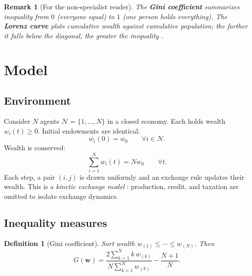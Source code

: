 \documentclass[12pt,a4paper]{article}
\newtheorem{definition}{Definition}
\newtheorem{remark}{Remark}
\begin{document}
\begin{remark}[For the non-specialist reader]
  The \textbf{Gini coefficient} summarizes inequality from $0$ (everyone equal) to $1$ (one person holds everything).
  The \textbf{Lorenz curve} plots cumulative wealth against cumulative population; the farther it falls below the diagonal, the greater the inequality \citep{lorenz1905, gini1912}.
\end{remark}

\section{Model}
\label{sec:model}

\subsection{Environment}

Consider $N$ agents $\mathcal{N} = \{1,\ldots,N\}$ in a closed economy.
Each holds wealth $w_i(t) \geq 0$.
Initial endowments are identical:
\begin{equation}
  w_i(0) = w_0 \qquad \forall i \in \mathcal{N}.
  \label{eq:init}
\end{equation}
Wealth is conserved:
\begin{equation}
  \sum_{i=1}^{N} w_i(t) = N w_0 \qquad \forall t.
  \label{eq:conservation}
\end{equation}
Each step, a pair $(i,j)$ is drawn uniformly and an exchange rule updates their wealth.
This is a \emph{kinetic exchange model} \citep{yakovenko2009, lux2008}: production, credit, and taxation are omitted to isolate exchange dynamics.

\subsection{Inequality measures}

\begin{definition}[Gini coefficient]
  Sort wealth $w_{(1)} \leq \cdots \leq w_{(N)}$. Then
  \begin{equation}
    G(\mathbf{w}) = \frac{2 \sum_{k=1}^{N} k\, w_{(k)}}{N \sum_{k=1}^{N} w_{(k)}} - \frac{N+1}{N}.
    \label{eq:gini}
  \end{equation}
\end{definition}
\end{document}

